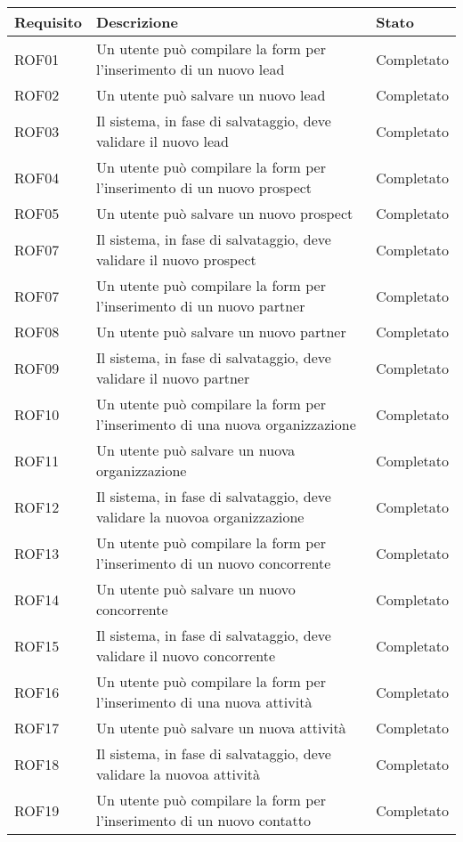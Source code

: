 \begin{longtable}[H]{|p{3cm}|p{8cm}|p{3cm}|}
	\hline
	\textbf{Requisito} & \textbf{Descrizione} & \textbf{Stato}\\
	\hline
	ROF01&Un utente può compilare la form per l'inserimento di un nuovo lead&Completato\\
	\hline
	ROF02&Un utente può salvare un nuovo lead&Completato\\
	\hline
	ROF03&Il sistema, in fase di salvataggio, deve validare il nuovo lead &Completato\\
	\hline
	ROF04&Un utente può compilare la form per l'inserimento di un nuovo prospect &Completato\\
	\hline
	ROF05&Un utente può salvare un nuovo prospect&Completato\\
	\hline
	ROF07&Il sistema, in fase di salvataggio, deve validare il nuovo prospect&Completato \\
	\hline
	ROF07&Un utente può compilare la form per l'inserimento di un nuovo partner  & Completato\\
	\hline
	ROF08&Un utente può salvare un nuovo partner&Completato\\
	\hline
	ROF09&Il sistema, in fase di salvataggio, deve validare il nuovo partner&Completato \\
	\hline
	ROF10&Un utente può compilare la form per l'inserimento di una nuova organizzazione  & Completato\\
	\hline
	ROF11&Un utente può salvare un nuova organizzazione&Completato\\
	\hline
	ROF12&Il sistema, in fase di salvataggio, deve validare la nuovoa organizzazione&Completato \\
	\hline
	ROF13&Un utente può compilare la form per l'inserimento di un nuovo concorrente  & Completato\\
	\hline
	ROF14&Un utente può salvare un nuovo concorrente&Completato\\
	\hline
	ROF15&Il sistema, in fase di salvataggio, deve validare il nuovo concorrente&Completato \\
	\hline
	ROF16&Un utente può compilare la form per l'inserimento di una nuova attività  & Completato\\
	\hline
	ROF17&Un utente può salvare un nuova attività&Completato\\
	\hline
	ROF18&Il sistema, in fase di salvataggio, deve validare la nuovoa attività&Completato \\
	\hline
	ROF19&Un utente può compilare la form per l'inserimento di un nuovo contatto&Completato\\

\end{longtable}
